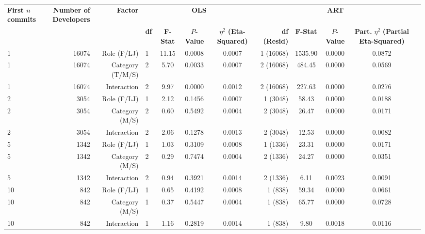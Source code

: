 \begin{landscape}
\begin{table}[H]
{}
\begin{tabular}{l r r l ccc r ccc r}
\toprule
\makecell[t]{\textbf{First $n$}\\\textbf{commits}} & \makecell[t]{\textbf{Number of}\\\textbf{Developers}} & \textbf{Factor} & \multicolumn{4}{c}{\textbf{OLS}} & \multicolumn{4}{c}{\textbf{ART}} \\ 
\cmidrule(lr){4-7} \cmidrule(lr){8-11}
 &  &  & \textbf{df} & \textbf{F-Stat} & \textbf{$P$-Value} & \makecell[t]{\textbf{$\eta^2$}\\\textbf{(Eta-Squared)}} & \textbf{df (Resid)} & \textbf{F-Stat} & \textbf{$P$-Value} & \makecell[t]{\textbf{Part.}\\\textbf{$\eta^2$}\\\textbf{(Partial}\\\textbf{Eta-Squared)}} \\ 
\midrule
1 & 16074 & Role (F/LJ) & 1 & 11.15 & 0.0008 & 0.0007 & 1 (16068) & 1535.90 & 0.0000 & 0.0872 \\ 
1 & 16074 & Category (T/M/S) & 2 & 5.70 & 0.0033 & 0.0007 & 2 (16068) & 484.45 & 0.0000 & 0.0569 \\ 
1 & 16074 & Interaction & 2 & 9.97 & 0.0000 & 0.0012 & 2 (16068) & 227.63 & 0.0000 & 0.0276 \\ 
2 & 3054 & Role (F/LJ) & 1 & 2.12 & 0.1456 & 0.0007 & 1 (3048) & 58.43 & 0.0000 & 0.0188 \\ 
2 & 3054 & Category (M/S) & 2 & 0.60 & 0.5492 & 0.0004 & 2 (3048) & 26.47 & 0.0000 & 0.0171 \\ 
2 & 3054 & Interaction & 2 & 2.06 & 0.1278 & 0.0013 & 2 (3048) & 12.53 & 0.0000 & 0.0082 \\ 
5 & 1342 & Role (F/LJ) & 1 & 1.03 & 0.3109 & 0.0008 & 1 (1336) & 23.31 & 0.0000 & 0.0171 \\ 
5 & 1342 & Category (M/S) & 2 & 0.29 & 0.7474 & 0.0004 & 2 (1336) & 24.27 & 0.0000 & 0.0351 \\ 
5 & 1342 & Interaction & 2 & 0.94 & 0.3921 & 0.0014 & 2 (1336) & 6.11 & 0.0023 & 0.0091 \\ 
10 & 842 & Role (F/LJ) & 1 & 0.65 & 0.4192 & 0.0008 & 1 (838) & 59.34 & 0.0000 & 0.0661 \\ 
10 & 842 & Category (M/S) & 1 & 0.37 & 0.5447 & 0.0004 & 1 (838) & 65.77 & 0.0000 & 0.0728 \\ 
10 & 842 & Interaction & 1 & 1.16 & 0.2819 & 0.0014 & 1 (838) & 9.80 & 0.0018 & 0.0116 \\ 
\bottomrule
\end{tabular}%
\label{tab:codebase_graph_latex_repository_graph_component_time_series_ART_anova_methods} 
\end{table}
\end{landscape}
\newpage 
